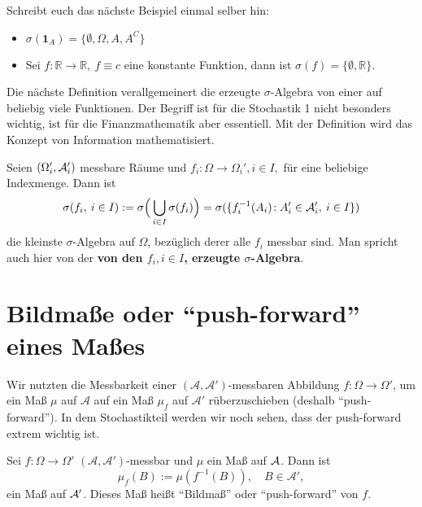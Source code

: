 Schreibt euch das n\"achste Beispiel einmal selber hin:
\begin{beispiel}
\label{yu}\abs
	\begin{itemize}
		\item $\sigma(\mathbf{1}_A) = \{ \emptyset, \Omega, A, A^C \}$
		\item Sei $f \! : \mathbb{R} \rightarrow \mathbb{R}, \: f\equiv c$ eine konstante Funktion, dann ist $\sigma(f) = \{ \emptyset, \mathbb{R} \}$.
	\end{itemize}
\end{beispiel}
Die n\"achste Definition verallgemeinert die erzeugte $\sigma$-Algebra von einer auf beliebig viele Funktionen. Der Begriff ist f\"ur die Stochastik 1 nicht besonders wichtig, ist f\"ur die Finanzmathematik aber essentiell. Mit der Definition wird das Konzept von Information mathematisiert.
\begin{deff}\label{def:generatedsigmaalgebra}
	Seien $(\Omega_i',\mathcal{A}_i')$ messbare Räume und $f_i \! : \Omega \rightarrow \Omega_i', i \in I,$ f\"ur eine beliebige Indexmenge. Dann ist \[\sigma(f_i, \: i \in I) := \sigma \Big(\bigcup_{i \in I}\sigma(f_i)\Big) = \sigma(\{ f_i^{-1}(A_i) \! : A'_i \in \mathcal{A}'_i, \: i \in I \}) \] die kleinste $\sigma$-Algebra auf $\Omega$, bez\"uglich derer alle $f_i$ messbar sind. Man spricht auch hier von der \textbf{von den $f_i, i\in I$, erzeugte $\sigma$-Algebra}.
\end{deff}

\section{Bildmaße oder \enquote{push-forward} eines Maßes}\label{sec:push}

Wir nutzten die Messbarkeit einer $(\mathcal A, \mathcal A')$-messbaren Abbildung $f:\Omega\to \Omega'$, um ein Ma\ss{} $\mu$ auf $\mathcal A$ auf ein Ma\ss{} $\mu_f$ auf $\mathcal A'$ r\"uberzuschieben (deshalb \enquote{push-forward}). In dem Stochastikteil werden wir noch sehen, dass der push-forward extrem wichtig ist.

\begin{satz}\label{pushf}
	Sei $f:\Omega \rightarrow \Omega'$ $(\mathcal A, \mathcal A')$-messbar und $\mu$ ein Maß auf $\mathcal{A}$. Dann ist 
	\[ \mu_f(B) := \mu\left(f^{-1}(B)\right),\quad B\in \mathcal A', \] ein Maß auf $\mathcal{A}'$. Dieses Maß heißt \enquote{Bildmaß} oder \enquote{push-forward} von $f$.
\end{satz}

